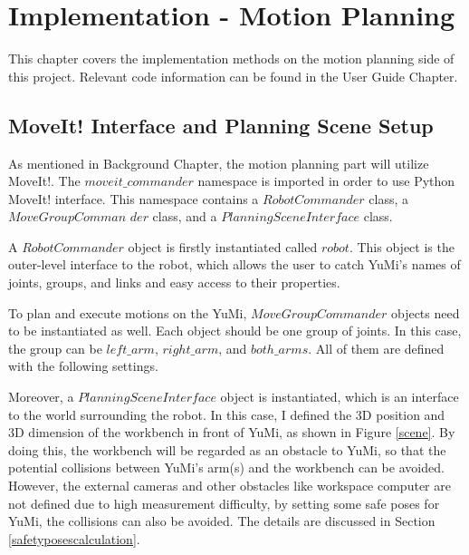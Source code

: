 \chapter{Implementation - Motion Planning}

This chapter covers the implementation methods on the motion planning side of this project. Relevant code information can be found in the User Guide Chapter.

\section{MoveIt! Interface and Planning Scene Setup} \label{motionplansetup}
As mentioned in Background Chapter, the motion planning part will utilize MoveIt!. The $moveit\_commander$ namespace is imported in order to use Python MoveIt! interface. This namespace contains a $RobotCommander$ class, a $MoveGroupComman$ $der$ class, and a $PlanningSceneInterface$ class.

A $RobotCommander$ object is firstly instantiated called $robot$. This object is the outer-level interface to the robot, which allows the user to catch YuMi's names of joints, groups, and links and easy access to their properties.

To plan and execute motions on the YuMi, $MoveGroupCommander$ objects need to be instantiated as well. Each object should be one group of joints. In this case, the group can be $left\_arm$, $right\_arm$, and $both\_arms$. All of them are defined with the following settings.

\begin{table}[H]
\centering
{}
\caption{Settings of three $MoveGroupCommander$ objects: $left\_arm$, $right\_$ $arm$, and $both\_arms$}
\label{armsetup}
\end{table}

Moreover, a $PlanningSceneInterface$ object is instantiated, which is an interface to the world surrounding the robot. In this case, I defined the 3D position and 3D dimension of the workbench in front of YuMi, as shown in Figure \ref{scene}. By doing this, the workbench will be regarded as an obstacle to YuMi, so that the potential collisions between YuMi's arm(s) and the workbench can be avoided. However, the external cameras and other obstacles like workspace computer are not defined due to high measurement difficulty, by setting some safe poses for YuMi, the collisions can also be avoided. The details are discussed in Section \ref{safetyposescalculation}.

